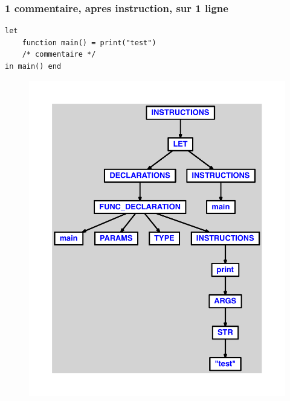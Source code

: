 \documentclass{article}
\begin{document}
\subsubsection{1 commentaire, apres instruction, sur 1 ligne}
\begin{lstlisting}
let
	function main() = print("test")
	/* commentaire */
in main() end
\end{lstlisting}
\newpage
\begin{figure}[H]
\centering
\includegraphics[max width=\textwidth]{ast/ast_152.pdf}
\end{figure}
\newpage
\end{document}

